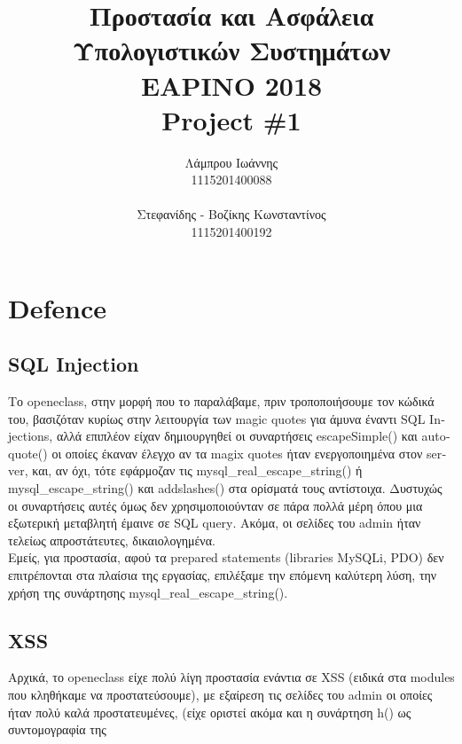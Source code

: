 \documentclass{article}
\begin{document}
\title{\vspace{-3.5cm}\textbf{Προστασία και Ασφάλεια Υπολογιστικών Συστημάτων \\ΕΑΡΙΝΟ 2018\\ \textlatin{Project \#}1}}
\author{Λάμπρου Ιωάννης \\1115201400088\\\\ Στεφανίδης - Βοζίκης Κωνσταντίνος \\1115201400192}

\maketitle
\section*{\textlatin{Defence}}
\subsection*{\textlatin{SQL Injection}}
Το \textlatin{openeclass}, στην μορφή που το παραλάβαμε, πριν τροποποιήσουμε τον κώδικά του, βασιζόταν κυρίως στην λειτουργία των \textlatin{magic quotes} για άμυνα έναντι \textlatin{SQL Injections}, αλλά επιπλέον είχαν δημιουργηθεί οι συναρτήσεις \textlatin{escapeSimple()} και \textlatin{autoquote()} οι οποίες έκαναν έλεγχο αν τα \textlatin{magix quotes} ήταν ενεργοποιημένα στον \textlatin{server}, και, αν όχι, τότε εφάρμοζαν τις \textlatin{mysql\_real\_escape\_string()} ή \textlatin{mysql\_escape\_string()} και \textlatin{addslashes()} στα ορίσματά τους αντίστοιχα. Δυστυχώς οι συναρτήσεις αυτές όμως δεν χρησιμοποιούνταν σε πάρα πολλά μέρη όπου μια εξωτερική μεταβλητή έμαινε σε \textlatin{SQL query}. Ακόμα, οι σελίδες του \textlatin{admin} ήταν τελείως απροστάτευτες, δικαιολογημένα.\\
Εμείς, για προστασία, αφού τα \textlatin{prepared statements (libraries MySQLi, PDO)} δεν επιτρέπονται στα πλαίσια της εργασίας, επιλέξαμε την επόμενη καλύτερη λύση, την χρήση της συνάρτησης \textlatin{mysql\_real\_escape\_string()}.


\subsection*{\textlatin{XSS}}
Αρχικά, το \textlatin{openeclass} είχε πολύ λίγη προστασία ενάντια σε \textlatin{XSS} (ειδικά στα \textlatin{modules} που κληθήκαμε να προστατεύσουμε), με εξαίρεση τις σελίδες του \textlatin{admin} οι οποίες ήταν πολύ καλά προστατευμένες, (είχε οριστεί ακόμα και η συνάρτηση \textlatin{h()} ως συντομογραφία της  
\end{document}

